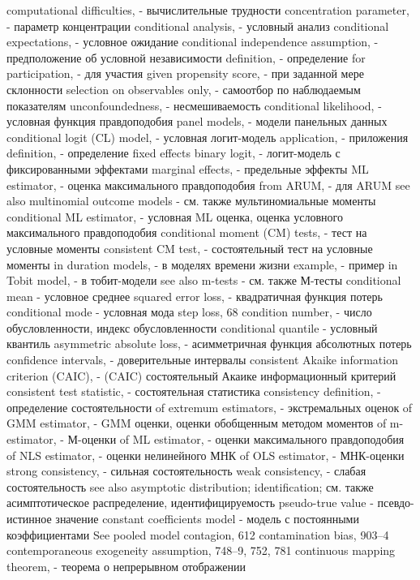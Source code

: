 computational difficulties, - вычислительные трудности
concentration parameter, - параметр концентрации
conditional analysis, - условный анализ
conditional expectations, - условное ожидание
conditional independence assumption, - предположение об условной независимости
definition, - определение
for participation, - для участия
given propensity score, - при заданной мере склонности 
selection on observables only, - самоотбор по наблюдаемым показателям
unconfoundedness, - несмешиваемость
conditional likelihood, - условная функция правдоподобия
panel models, - модели панельных данных
conditional logit (CL) model, - условная логит-модель
application, - приложения
definition, - определение
fixed effects binary logit, - логит-модель с фиксированными эффектами 
marginal effects, - предельные эффекты
ML estimator, - оценка максимального правдоподобия
from ARUM, - для ARUM
see also multinomial outcome models - см. также мультиномиальные моменты
conditional ML estimator, - условная ML оценка, оценка условного максимального правдоподобия
conditional moment (CM) tests, - тест на условные моменты
consistent CM test, - состоятельный тест на условные моменты
in duration models, - в моделях времени жизни
example, - пример
in Tobit model, - в тобит-модели
see also m-tests - см. также М-тесты
conditional mean - условное среднее
squared error loss, - квадратичная функция потерь
conditional mode - условная мода
step loss, 68 
condition number, - число обусловленности, индекс обусловленности
conditional quantile - условный квантиль
asymmetric absolute loss, - асимметричная функция абсолютных потерь
confidence intervals, - доверительные интервалы
consistent Akaike information criterion (CAIC), - (CAIC) состоятельный Акаике информационный критерий
consistent test statistic, - состоятельная статистика
consistency definition, - определение состоятельности
of extremum estimators, - экстремальных оценок
of GMM estimator, - GMM оценки, оценки обобщенным методом моментов
of m-estimator, - М-оценки
of ML estimator, - оценки максимального правдоподобия
of NLS estimator, - оценки нелинейного МНК
of OLS estimator, - МНК-оценки
strong consistency, - сильная состоятельность
weak consistency, - слабая состоятельность
see also asymptotic distribution; identification; см. также асимптотическое распределение, идентифицируемость
pseudo-true value - псевдо-истинное значение
constant coefficients model - модель с постоянными коэффициентами
See pooled model contagion, 612
contamination bias, 903–4
contemporaneous exogeneity assumption, 748–9, 752,
781
continuous mapping theorem, - теорема о непрерывном отображении 
